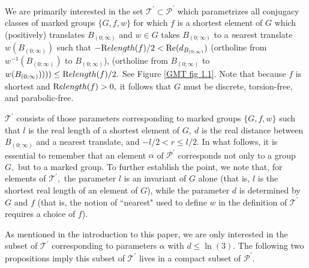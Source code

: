 We are primarily interested in the set 
$\mathcal {T}^{\prime}\subset \mathcal {P}^{\prime}$
which parametrizes all conjugacy classes of 
marked groups
$\{G,f,w\}$ for which $f$ is a shortest element  of $G$ which (positively) translates $B_{(0;\infty)}$ and $w\in G$ takes $ B_{(0;\infty)}$ to a
{\textit nearest} translate $w(B_{(0;\infty)})$ such that 
$-{\textrm Relength}(f)/2< \mathrm {Re}(d_ {B_{(0;\infty)}})$
(ortholine from $w^{-1}( B_{(0;\infty)})$ to $ B_{(0;\infty)}$),
(ortholine from $ B_{(0;\infty)}$ to $w(B_{(0;\infty)}))))
\le {\textrm Relength}(f)/2.$  
See Figure \ref{GMT fig 1.1}.
Note that because $f$ is shortest and
${\textrm Relength}(f) > 0,$ it follows that $G$ must be 
discrete, torsion-free, and parabolic-free.
 


\begin{remark}  \label{GMT 1.9} $\mathcal {T}^{\prime}$ consists of those parameters corresponding to marked groups $\{G,f,w\}$ such that $l$ is the real
length of a shortest element of $G,\  d$ is the real distance between $ B_{(0;\infty)}$ and a nearest
translate, and $-l/2<r\le l/2.$  
In what follows, it is
essential to remember that an element $\alpha$ of $\mathcal {P^{\prime}}$ corresponds not only
to a group $G,$ but to a marked group.  
To further establish the point, we note that,
for elements of $\mathcal {T}^{\prime},$
the parameter $l$ is an invariant of $G$ alone (that is, $l$ is the shortest real length of an element of $G$), while  the parameter $d$ is determined by $G$ and $f$ (that is, the notion of ``nearest" used to define $w$ in the definition of $\mathcal {T}^{\prime}$ requires a choice of $f$).

As mentioned in the introduction to this paper, we are only interested in the subset of $\mathcal {T}^{\prime}$ corresponding to
parameters $\alpha$ with $d \le \ln(3).$  The
following two propositions imply this subset of $\mathcal {T}^{\prime}$ lives in a compact subset of $\mathcal {P}^{\prime}.$
\end{remark}

